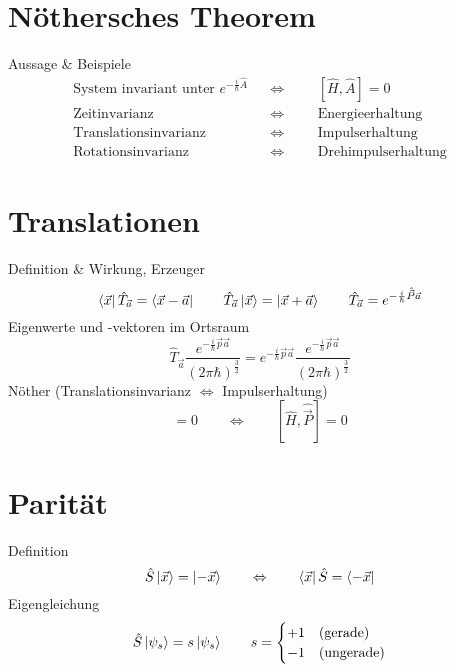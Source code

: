 \section{Nöthersches Theorem}

Aussage \& Beispiele \cite[S. 192]{qm}
\begin{align*}
		\text{System invariant unter $e^{-\frac{i}{\hbar}\hat{A}}$} &&\Leftrightarrow&&& \left[\hat{H},\hat{A}\right]=0 \\
		\text{Zeitinvarianz} &&\Leftrightarrow&&& \text{Energieerhaltung} \\
		\text{Translationsinvarianz} &&\Leftrightarrow&&& \text{Impulserhaltung} \\
		\text{Rotationsinvarianz} &&\Leftrightarrow&&& \text{Drehimpulserhaltung}
\end{align*}

\section{Translationen}

Definition \& Wirkung, Erzeuger \cite[Glg. 6.12, 6.8, 6.11]{qm}
\begin{equation*}
	\bra{\vec{x}}\hat{T}_{\vec{a}} = \bra{\vec{x}-\vec{a}} \qquad \hat{T}_{\vec{a}}\ket{\vec{x}} = \ket{\vec{x}+\vec{a}} \qquad \hat{T}_{\vec{a}} = e^{-\frac{i}{\hbar}\hat{\vec{P}}\vec{a}}
\end{equation*}
Eigenwerte und -vektoren im Ortsraum \cite[Glg. 6.15]{qm}
\begin{equation*}
	\hat{T}_{\vec{a}}\frac{e^{-\frac{i}{\hbar}\vec{p}\vec{a}}}{(2\pi\hbar)^\frac{3}{2}} = e^{-\frac{i}{\hbar}\vec{p}\vec{a}}\frac{e^{-\frac{i}{\hbar}\vec{p}\vec{a}}}{(2\pi\hbar)^\frac{3}{2}}
\end{equation*}
Nöther (Translationsinvarianz $\Leftrightarrow$ Impulserhaltung) \cite[Glg. 6.16]{qm}
\begin{equation*}
	[\hat{H}, \hat{T}_{\vec{a}}]=0 \qquad \Leftrightarrow \qquad [\hat{H}, \hat{\vec{P}}]=0
\end{equation*}

\section{Parität}

Definition \cite[Glg. 4.32]{qm}
\begin{equation*}
	\hat{S}\ket{\vec{x}} = \ket{-\vec{x}} \qquad \Leftrightarrow \qquad \bra{\vec{x}}\hat{S} = \bra{-\vec{x}}
\end{equation*}
Eigengleichung \cite[Glg. 4.33]{qm}
\begin{equation*}
	\hat{S}\ket{\psi_s} = s\ket{\psi_s} \qquad s=\begin{cases}
		+1 & \text{(gerade)} \\
		-1 & \text{(ungerade)}
	\end{cases}
\end{equation*}

